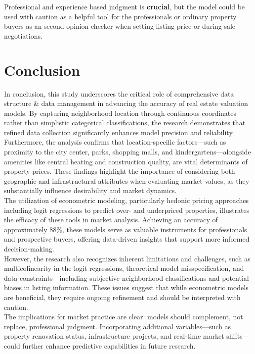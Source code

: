 \documentclass[]{article}
\begin{document}
Professional and experience based judgment is \textbf{crucial}, but the model could be used with caution as a helpful tool for the professionals or ordinary property buyers as an second opinion checker when setting listing price or during sale negotiations.

\newpage
\section{Conclusion}

In conclusion, this study underscores the critical role of comprehensive data structure \& data management in advancing the accuracy of real estate valuation models. By capturing neighborhood location through continuous coordinates rather than simplistic categorical classifications, the research demonstrates that refined data collection significantly enhances model precision and reliability.\\


Furthermore, the analysis confirms that location-specific factors—such as proximity to the city center, parks, shopping malls, and kindergartens—alongside amenities like central heating and construction quality, are vital determinants of property prices. These findings highlight the importance of considering both geographic and infrastructural attributes when evaluating market values, as they substantially influence desirability and market dynamics.\\

The utilization of econometric modeling, particularly hedonic pricing approaches including logit regressions to predict over- and underpriced properties, illustrates the efficacy of these tools in market analysis. Achieving an accuracy of approximately 88\%, these models serve as valuable instruments for professionals and prospective buyers, offering data-driven insights that support more informed decision-making.\\


However, the research also recognizes inherent limitations and challenges, such as multicolinearity in the logit regressions, theoretical model misspecification, and data constraints—including subjective neighborhood classifications and potential biases in listing information. These issues suggest that while econometric models are beneficial, they require ongoing refinement and should be interpreted with caution.
\\

The implications for market practice are clear: models should complement, not replace, professional judgment. Incorporating additional variables—such as property renovation status, infrastructure projects, and real-time market shifts—could further enhance predictive capabilities in future research.\\
\end{document}
